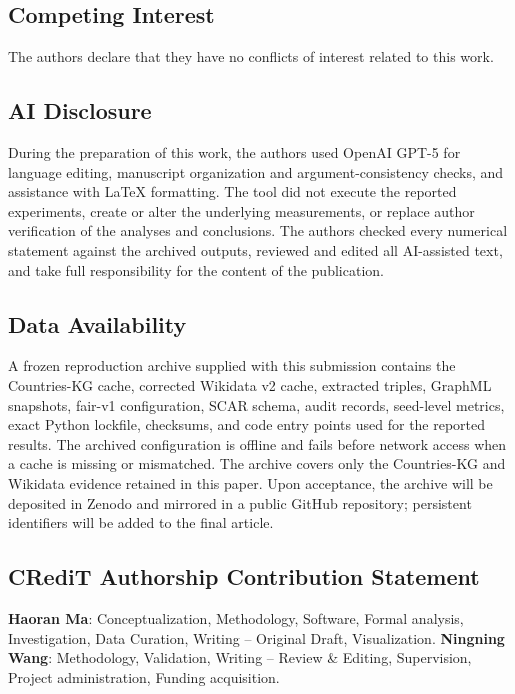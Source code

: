 \documentclass[pdflatex,sn-basic]{sn-jnl}
\begin{document}
\subsection*{Competing Interest}
The authors declare that they have no conflicts of interest related to this work.

\subsection*{AI Disclosure}
During the preparation of this work, the authors used OpenAI GPT-5 for language editing, manuscript organization and argument-consistency checks, and assistance with LaTeX formatting. The tool did not execute the reported experiments, create or alter the underlying measurements, or replace author verification of the analyses and conclusions. The authors checked every numerical statement against the archived outputs, reviewed and edited all AI-assisted text, and take full responsibility for the content of the publication.

\subsection*{Data Availability}
A frozen reproduction archive supplied with this submission contains the Countries-KG cache, corrected Wikidata v2 cache, extracted triples, GraphML snapshots, fair-v1 configuration, SCAR schema, audit records, seed-level metrics, exact Python lockfile, checksums, and code entry points used for the reported results. The archived configuration is offline and fails before network access when a cache is missing or mismatched. The archive covers only the Countries-KG and Wikidata evidence retained in this paper. Upon acceptance, the archive will be deposited in Zenodo and mirrored in a public GitHub repository; persistent identifiers will be added to the final article.

\subsection*{CRediT Authorship Contribution Statement}
\textbf{Haoran Ma}: Conceptualization, Methodology, Software, Formal analysis, Investigation, Data Curation, Writing -- Original Draft, Visualization. \textbf{Ningning Wang}: Methodology, Validation, Writing -- Review \& Editing, Supervision, Project administration, Funding acquisition.

\clearpage


\end{document}
